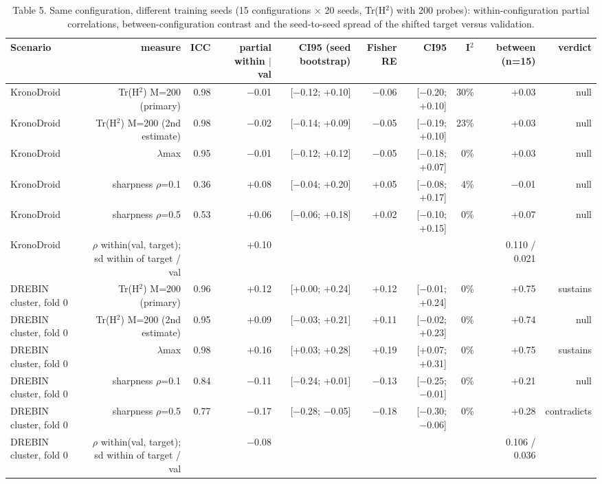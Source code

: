 \begin{table}[t]
\centering\small
\caption{Table 5. Same configuration, different training seeds (15 configurations $\times$ 20 seeds, Tr(H$^2$) with 200 probes): within-configuration partial correlations, between-configuration contrast and the seed-to-seed spread of the shifted target versus validation.}
\label{tab:within}
\begin{tabular}{lrrrrrrrrr}
\toprule
Scenario & measure & ICC & partial within $\mid$ val & CI95 (seed bootstrap) & Fisher RE & CI95 & I$^2$ & between (n=15) & verdict \\
\midrule
KronoDroid & Tr(H$^2$) M=200 (primary) & 0.98 & $-$0.01 & [$-$0.12; +0.10] & $-$0.06 & [$-$0.20; +0.10] & 30\% & +0.03 & null \\
KronoDroid & Tr(H$^2$) M=200 (2nd estimate) & 0.98 & $-$0.02 & [$-$0.14; +0.09] & $-$0.05 & [$-$0.19; +0.10] & 23\% & +0.03 & null \\
KronoDroid & $\lambda$max & 0.95 & $-$0.01 & [$-$0.12; +0.12] & $-$0.05 & [$-$0.18; +0.07] & 0\% & +0.03 & null \\
KronoDroid & sharpness $\rho$=0.1 & 0.36 & +0.08 & [$-$0.04; +0.20] & +0.05 & [$-$0.08; +0.17] & 4\% & $-$0.01 & null \\
KronoDroid & sharpness $\rho$=0.5 & 0.53 & +0.06 & [$-$0.06; +0.18] & +0.02 & [$-$0.10; +0.15] & 0\% & +0.07 & null \\
KronoDroid & $\rho$ within(val, target); sd within of target / val &  & +0.10 &  &  &  &  & 0.110 / 0.021 &  \\
DREBIN cluster, fold 0 & Tr(H$^2$) M=200 (primary) & 0.96 & +0.12 & [+0.00; +0.24] & +0.12 & [$-$0.01; +0.24] & 0\% & +0.75 & sustains \\
DREBIN cluster, fold 0 & Tr(H$^2$) M=200 (2nd estimate) & 0.95 & +0.09 & [$-$0.03; +0.21] & +0.11 & [$-$0.02; +0.23] & 0\% & +0.74 & null \\
DREBIN cluster, fold 0 & $\lambda$max & 0.98 & +0.16 & [+0.03; +0.28] & +0.19 & [+0.07; +0.31] & 0\% & +0.75 & sustains \\
DREBIN cluster, fold 0 & sharpness $\rho$=0.1 & 0.84 & $-$0.11 & [$-$0.24; +0.01] & $-$0.13 & [$-$0.25; $-$0.01] & 0\% & +0.21 & null \\
DREBIN cluster, fold 0 & sharpness $\rho$=0.5 & 0.77 & $-$0.17 & [$-$0.28; $-$0.05] & $-$0.18 & [$-$0.30; $-$0.06] & 0\% & +0.28 & contradicts \\
DREBIN cluster, fold 0 & $\rho$ within(val, target); sd within of target / val &  & $-$0.08 &  &  &  &  & 0.106 / 0.036 &  \\

\end{tabular}
\end{table}
